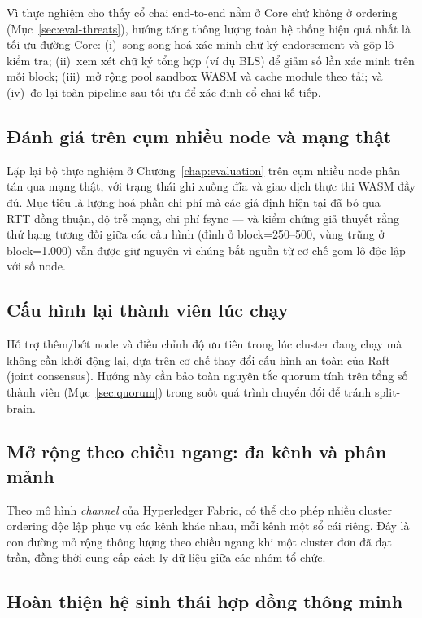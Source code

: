 Vì thực nghiệm cho thấy cổ chai end-to-end nằm ở Core chứ không ở ordering
(Mục~\ref{sec:eval-threats}), hướng tăng thông lượng toàn hệ thống hiệu quả nhất
là tối ưu đường Core: (i)~song song hoá xác minh chữ ký endorsement và
gộp lô kiểm tra; (ii)~xem xét chữ ký tổng hợp (ví dụ BLS) để giảm số
lần xác minh trên mỗi block; (iii)~mở rộng pool sandbox WASM và cache module theo
tải; và (iv)~đo lại toàn pipeline sau tối ưu để xác định cổ chai kế tiếp.

\subsection{Đánh giá trên cụm nhiều node và mạng thật}
\label{sec:fw-multinode}

Lặp lại bộ thực nghiệm ở Chương~\ref{chap:evaluation} trên cụm nhiều
node phân tán qua mạng thật, với trạng thái ghi xuống đĩa và giao dịch thực thi
WASM đầy đủ. Mục tiêu là lượng hoá phần chi phí mà các giả định hiện tại đã bỏ
qua --- RTT đồng thuận, độ trễ mạng, chi phí fsync --- và kiểm chứng giả thuyết
rằng thứ hạng tương đối giữa các cấu hình (đỉnh ở block=250--500, vùng trũng ở
block=1.000) vẫn được giữ nguyên vì chúng bắt nguồn từ cơ chế gom lô độc lập với
số node.

\subsection{Cấu hình lại thành viên lúc chạy}
\label{sec:fw-membership}

Hỗ trợ thêm/bớt node và điều chỉnh độ ưu tiên trong lúc cluster đang
chạy mà không cần khởi động lại, dựa trên cơ chế thay đổi cấu hình an toàn của
Raft (joint consensus). Hướng này cần bảo toàn nguyên tắc quorum tính trên tổng
số thành viên (Mục~\ref{sec:quorum}) trong suốt quá trình chuyển đổi để
tránh split-brain.

\subsection{Mở rộng theo chiều ngang: đa kênh và phân mảnh}
\label{sec:fw-scaling}

Theo mô hình \textit{channel} của Hyperledger Fabric, có thể cho phép nhiều
cluster ordering độc lập phục vụ các kênh khác nhau, mỗi kênh một sổ cái riêng.
Đây là con đường mở rộng thông lượng theo chiều ngang khi một cluster đơn đã đạt
trần, đồng thời cung cấp cách ly dữ liệu giữa các nhóm tổ chức.

\subsection{Hoàn thiện hệ sinh thái hợp đồng thông minh}
\label{sec:fw-contracts}

